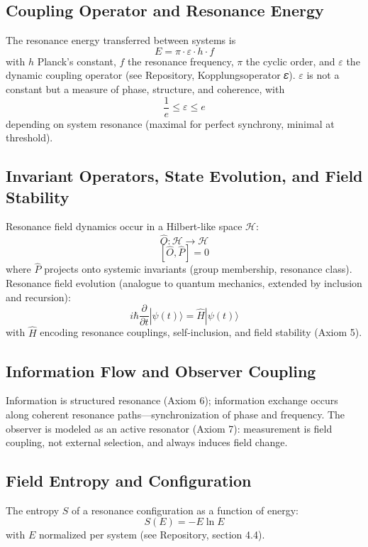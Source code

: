 \documentclass[12pt]{article}
\begin{document}
	\subsection{Coupling Operator and Resonance Energy}
	
	The resonance energy transferred between systems is
	\[
	E = \pi \cdot \varepsilon \cdot h \cdot f
	\]
	with $h$ Planck's constant, $f$ the resonance frequency, $\pi$ the cyclic order, and $\varepsilon$ the dynamic coupling operator (see Repository, Kopplungsoperator 𝜀). $\varepsilon$ is not a constant but a measure of phase, structure, and coherence, with
	\[
	\frac{1}{e} \leq \varepsilon \leq e
	\]
	depending on system resonance (maximal for perfect synchrony, minimal at threshold).
	
	\subsection{Invariant Operators, State Evolution, and Field Stability}
	
	Resonance field dynamics occur in a Hilbert-like space $\mathcal{H}$:
	\[
	\hat{O} : \mathcal{H} \to \mathcal{H}
	\]
	\[
	[\hat{O}, \hat{P}] = 0
	\]
	where $\hat{P}$ projects onto systemic invariants (group membership, resonance class). Resonance field evolution (analogue to quantum mechanics, extended by inclusion and recursion):
	\[
	i\hbar \frac{\partial}{\partial t} |\psi(t)\rangle = \hat{H} |\psi(t)\rangle
	\]
	with $\hat{H}$ encoding resonance couplings, self-inclusion, and field stability (Axiom 5).
	
	\subsection{Information Flow and Observer Coupling}
	
	Information is structured resonance (Axiom 6); information exchange occurs along coherent resonance paths—synchronization of phase and frequency. The observer is modeled as an active resonator (Axiom 7): measurement is field coupling, not external selection, and always induces field change.

\subsection{Field Entropy and Configuration}

The entropy $S$ of a resonance configuration as a function of energy:
\[
S(E) = -E \ln E
\]
with $E$ normalized per system (see Repository, section 4.4).
\end{document}
